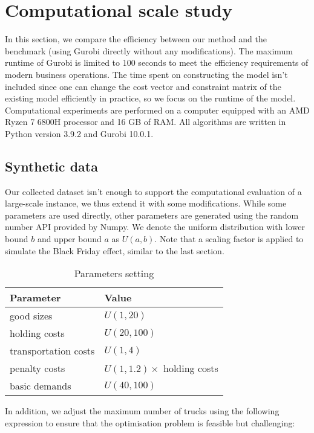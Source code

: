 \documentclass[a4paper,12pt]{article}
\begin{document}
\section{Computational scale study}\label{sec:computational-scale-study}
In this section, we compare the efficiency between our method and the benchmark (using Gurobi directly without any modifications).
The maximum runtime of Gurobi is limited to 100 seconds to meet the efficiency requirements of modern business operations.
The time spent on constructing the model isn't included since one can change the cost vector and constraint matrix of the existing model efficiently in practice, so we focus on the runtime of the model.
Computational experiments are performed on a computer equipped with an AMD Ryzen 7 6800H processor and 16 GB of RAM.
All algorithms are written in Python version 3.9.2 and Gurobi 10.0.1.

\subsection{Synthetic data}\label{subsec:synthetic-data}

Our collected dataset isn't enough to support the computational evaluation of a large-scale instance, we thus extend it with some modifications.
While some parameters are used directly, other parameters are generated using the random number API provided by Numpy.
We denote the uniform distribution with lower bound $b$ and upper bound $a$ as $U(a, b)$.
Note that a scaling factor is applied to simulate the Black Friday effect, similar to the last section.

\begin{table}[htbp]
    \centering
    \caption{Parameters setting}
    \label{tab:example}
    \begin{tabular}{ll}
        \toprule
        Parameter & Value \\
        \midrule
        good sizes & $U(1, 20)$ \\
        holding costs   & $U(20, 100)$  \\
        transportation costs   & $U(1, 4)$  \\
        penalty costs   & $U(1, 1.2) \times$ holding costs  \\
        basic demands         & $U(40, 100)$ \\
        \bottomrule
    \end{tabular}
\end{table}

In addition, we adjust the maximum number of trucks using the following expression to ensure that the optimisation problem is feasible but challenging:
\end{document}
